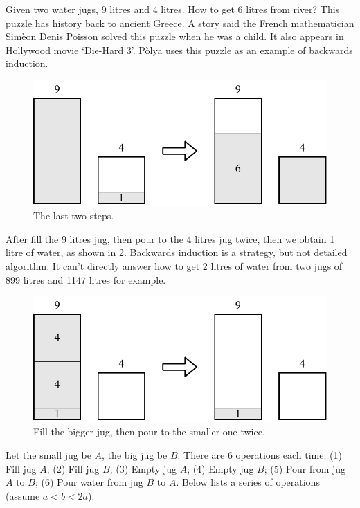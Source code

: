 \documentclass[b5paper]{article}
\begin{document}
Given two water jugs, 9 litres and 4 litres. How to get 6 litres from river? This puzzle has history back to ancient Greece. A story said the French mathematician Sim\`{e}on Denis Poisson solved this puzzle when he was a child. It also appears in Hollywood movie `Die-Hard 3'. P\`{o}lya uses this puzzle as an example of backwards induction\cite{how-to-solve-it}.

\begin{figure}[htbp]
 \centering
 \includegraphics[scale=0.5]{img/jugs-last}
 \caption{The last two steps.}
 \label{fig:jugs-r1}
\end{figure}

After fill the 9 litres jug, then pour to the 4 litres jug twice, then we obtain 1 litre of water, as shown in \cref{fig:jugs-r2}. Backwards induction is a strategy, but not detailed algorithm. It can't directly answer how to get 2 litres of water from two jugs of 899 litres and 1147 litres for example.

\begin{figure}[htbp]
 \centering
 \includegraphics[scale=0.5]{img/jugs-last-two}
 \caption{Fill the bigger jug, then pour to the smaller one twice.}
 \label{fig:jugs-r2}
\end{figure}

Let the small jug be $A$, the big jug be $B$. There are 6 operations each time: (1) Fill jug $A$; (2) Fill jug $B$; (3) Empty jug $A$; (4) Empty jug $B$; (5) Pour from jug $A$ to $B$; (6) Pour water from jug $B$ to $A$. Below lists a series of operations (assume $a < b < 2a$).
\end{document}
